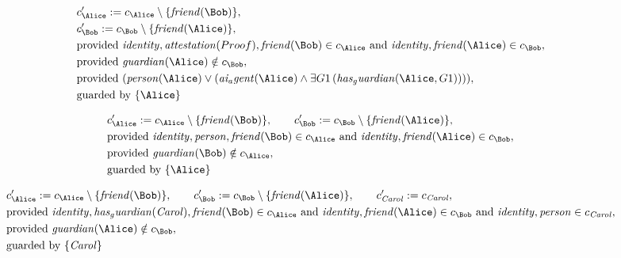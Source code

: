 \begin{align*}
&
c'_
{
\Alice
}
 := 
c_
{
\Alice
}
 \setminus 
\{
\mathit{
friend
}
(
\Bob
)
\}
,\\
&
c'_
{
\Bob
}
 := 
c_
{
\Bob
}
 \setminus 
\{
\mathit{
friend
}
(
\Alice
)
\}
,\\
&
\text{provided } 
\mathit{
identity
}
,
\mathit{
attestation
}
(
Proof
)
,
\mathit{
friend
}
(
\Bob
)
 \in c_
{
\Alice
}
 \text{ and } 
\mathit{
identity
}
,
\mathit{
friend
}
(
\Alice
)
 \in c_
{
\Bob
}
,\\
&
\text{provided } 
\mathit{
guardian
}
(
\Alice
)
 \notin c_
{
\Bob
}
,\\
&
\text{provided } 
(
\mathit{
person
}
(
\Alice
)
\lor
(
\mathit{
ai_agent
}
(
\Alice
)
\land
\exists 
G1
\,(
\mathit{
has_guardian
}
(
\Alice
,
G1
)
)
)
)
,\\
&
\text{guarded by } \{
\Alice
\}
\end{align*}

\begin{align*}
&
c'_
{
\Alice
}
 := 
c_
{
\Alice
}
 \setminus 
\{
\mathit{
friend
}
(
\Bob
)
\}
, \qquad 
c'_
{
\Bob
}
 := 
c_
{
\Bob
}
 \setminus 
\{
\mathit{
friend
}
(
\Alice
)
\}
,\\
&
\text{provided } 
\mathit{
identity
}
,
\mathit{
person
}
,
\mathit{
friend
}
(
\Bob
)
 \in c_
{
\Alice
}
 \text{ and } 
\mathit{
identity
}
,
\mathit{
friend
}
(
\Alice
)
 \in c_
{
\Bob
}
,\\
&
\text{provided } 
\mathit{
guardian
}
(
\Bob
)
 \notin c_
{
\Alice
}
,\\
&
\text{guarded by } \{
\Alice
\}
\end{align*}

\begin{align*}
&
c'_
{
\Alice
}
 := 
c_
{
\Alice
}
 \setminus 
\{
\mathit{
friend
}
(
\Bob
)
\}
, \qquad 
c'_
{
\Bob
}
 := 
c_
{
\Bob
}
 \setminus 
\{
\mathit{
friend
}
(
\Alice
)
\}
, \qquad 
c'_
{
\mathit{Carol}
}
 := 
c_
{
\mathit{Carol}
}
,\\
&
\text{provided } 
\mathit{
identity
}
,
\mathit{
has_guardian
}
(
\mathit{Carol}
)
,
\mathit{
friend
}
(
\Bob
)
 \in c_
{
\Alice
}
 \text{ and } 
\mathit{
identity
}
,
\mathit{
friend
}
(
\Alice
)
 \in c_
{
\Bob
}
 \text{ and } 
\mathit{
identity
}
,
\mathit{
person
}
 \in c_
{
\mathit{Carol}
}
,\\
&
\text{provided } 
\mathit{
guardian
}
(
\Alice
)
 \notin c_
{
\Bob
}
,\\
&
\text{guarded by } \{
\mathit{Carol}
\}
\end{align*}
